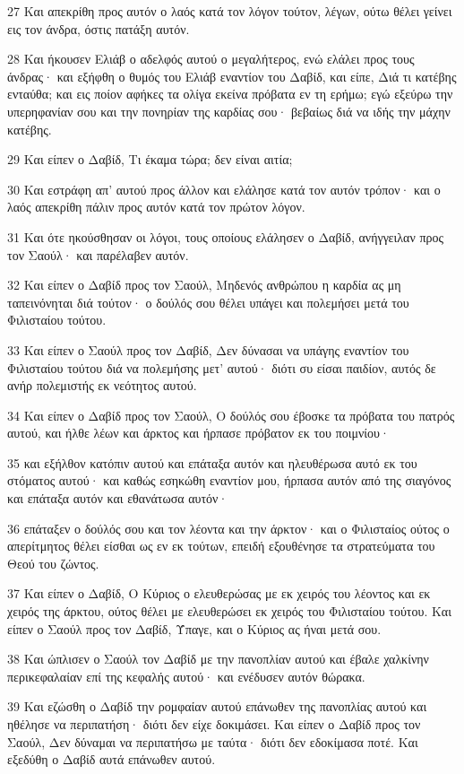 \par 27 Και απεκρίθη προς αυτόν ο λαός κατά τον λόγον τούτον, λέγων, ούτω θέλει γείνει εις τον άνδρα, όστις πατάξη αυτόν.
\par 28 Και ήκουσεν Ελιάβ ο αδελφός αυτού ο μεγαλήτερος, ενώ ελάλει προς τους άνδρας· και εξήφθη ο θυμός του Ελιάβ εναντίον του Δαβίδ, και είπε, Διά τι κατέβης ενταύθα; και εις ποίον αφήκες τα ολίγα εκείνα πρόβατα εν τη ερήμω; εγώ εξεύρω την υπερηφανίαν σου και την πονηρίαν της καρδίας σου· βεβαίως διά να ιδής την μάχην κατέβης.
\par 29 Και είπεν ο Δαβίδ, Τι έκαμα τώρα; δεν είναι αιτία;
\par 30 Και εστράφη απ' αυτού προς άλλον και ελάλησε κατά τον αυτόν τρόπον· και ο λαός απεκρίθη πάλιν προς αυτόν κατά τον πρώτον λόγον.
\par 31 Και ότε ηκούσθησαν οι λόγοι, τους οποίους ελάλησεν ο Δαβίδ, ανήγγειλαν προς τον Σαούλ· και παρέλαβεν αυτόν.
\par 32 Και είπεν ο Δαβίδ προς τον Σαούλ, Μηδενός ανθρώπου η καρδία ας μη ταπεινόνηται διά τούτον· ο δούλός σου θέλει υπάγει και πολεμήσει μετά του Φιλισταίου τούτου.
\par 33 Και είπεν ο Σαούλ προς τον Δαβίδ, Δεν δύνασαι να υπάγης εναντίον του Φιλισταίου τούτου διά να πολεμήσης μετ' αυτού· διότι συ είσαι παιδίον, αυτός δε ανήρ πολεμιστής εκ νεότητος αυτού.
\par 34 Και είπεν ο Δαβίδ προς τον Σαούλ, Ο δούλός σου έβοσκε τα πρόβατα του πατρός αυτού, και ήλθε λέων και άρκτος και ήρπασε πρόβατον εκ του ποιμνίου·
\par 35 και εξήλθον κατόπιν αυτού και επάταξα αυτόν και ηλευθέρωσα αυτό εκ του στόματος αυτού· και καθώς εσηκώθη εναντίον μου, ήρπασα αυτόν από της σιαγόνος και επάταξα αυτόν και εθανάτωσα αυτόν·
\par 36 επάταξεν ο δούλός σου και τον λέοντα και την άρκτον· και ο Φιλισταίος ούτος ο απερίτμητος θέλει είσθαι ως εν εκ τούτων, επειδή εξουθένησε τα στρατεύματα του Θεού του ζώντος.
\par 37 Και είπεν ο Δαβίδ, Ο Κύριος ο ελευθερώσας με εκ χειρός του λέοντος και εκ χειρός της άρκτου, ούτος θέλει με ελευθερώσει εκ χειρός του Φιλισταίου τούτου. Και είπεν ο Σαούλ προς τον Δαβίδ, Ύπαγε, και ο Κύριος ας ήναι μετά σου.
\par 38 Και ώπλισεν ο Σαούλ τον Δαβίδ με την πανοπλίαν αυτού και έβαλε χαλκίνην περικεφαλαίαν επί της κεφαλής αυτού· και ενέδυσεν αυτόν θώρακα.
\par 39 Και εζώσθη ο Δαβίδ την ρομφαίαν αυτού επάνωθεν της πανοπλίας αυτού και ηθέλησε να περιπατήση· διότι δεν είχε δοκιμάσει. Και είπεν ο Δαβίδ προς τον Σαούλ, Δεν δύναμαι να περιπατήσω με ταύτα· διότι δεν εδοκίμασα ποτέ. Και εξεδύθη ο Δαβίδ αυτά επάνωθεν αυτού.
